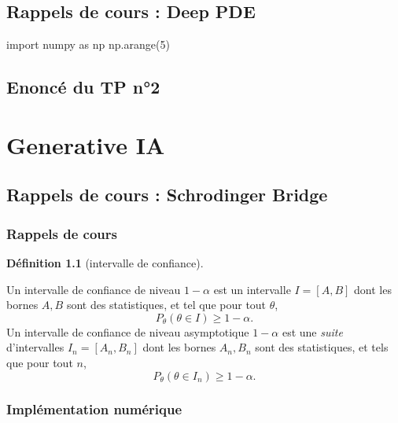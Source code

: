 \documentclass[
  10,
  letterpaper,
  DIV=11,
  numbers=noendperiod]{scrreport}
\theoremstyle{definition}
\newtheorem{definition}{Définition}[chapter]
\theoremstyle{remark}
\begin{document}
\chapter{Rappels de cours : Deep PDE}\label{rappels-de-cours-deep-pde}

import numpy as np np.arange(5)

\chapter{Enoncé du TP n°2}\label{enoncuxe9-du-tp-n2}

\part{Generative IA}

\chapter{Rappels de cours : Schrodinger
Bridge}\label{rappels-de-cours-schrodinger-bridge}

\section{Rappels de cours}\label{rappels-de-cours}

\begin{definition}[intervalle de
confiance]\protect\hypertarget{def-ic}{}\label{def-ic}

Un intervalle de confiance de niveau \(1-\alpha\) est un intervalle
\(I = [A,B]\) dont les bornes \(A,B\) sont des statistiques, et tel que
pour tout \(\theta\), \[P_\theta(\theta \in I) \geqslant 1 - \alpha.\]
Un intervalle de confiance de niveau asymptotique \(1-\alpha\) est une
\emph{suite} d'intervalles \(I_n = [A_n,B_n]\) dont les bornes
\(A_n,B_n\) sont des statistiques, et tels que pour tout \(n\),
\[ P_\theta(\theta \in I_n) \geqslant 1 - \alpha.\]

\end{definition}

\section{Implémentation numérique}\label{impluxe9mentation-numuxe9rique}
\end{document}
